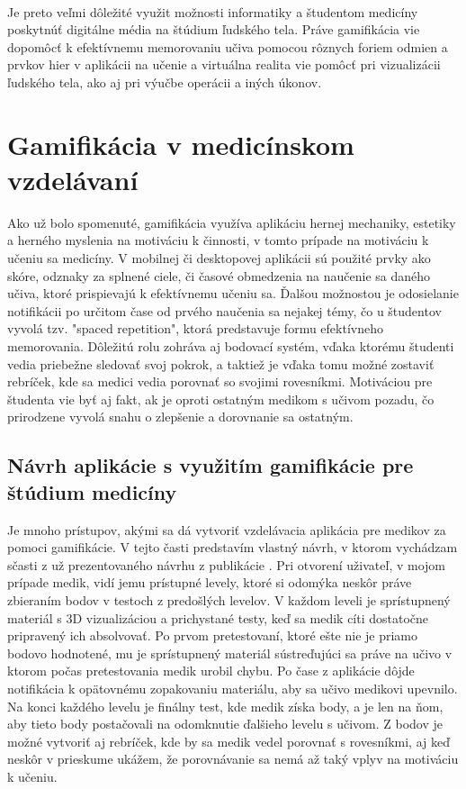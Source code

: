 \documentclass[10pt,twoside,slovak,a4paper]{article}
\begin{document}
\paragraph{}
Je preto veľmi dôležité využit možnosti informatiky a študentom medicíny poskytnúť digitálne média na štúdium ľudského tela. Práve gamifikácia vie dopomôcť k efektívnemu memorovaniu učiva pomocou rôznych foriem odmien a prvkov hier v aplikácii na učenie a virtuálna realita vie pomôcť pri vizualizácii ľudského tela, ako aj pri výučbe operácii a iných úkonov.



\section{Gamifikácia v medicínskom vzdelávaní} \label{druhacast}
Ako už bolo spomenuté, gamifikácia využíva aplikáciu hernej mechaniky, estetiky a herného myslenia na motiváciu k činnosti, v tomto prípade na motiváciu k učeniu sa medicíny. V mobilnej či desktopovej aplikácii sú použité prvky ako skóre, odznaky za splnené ciele, či časové obmedzenia na naučenie sa daného učiva, ktoré prispievajú k efektívnemu učeniu sa. \cite{RojasGamification} Ďalšou možnostou je odosielanie notifikácii po určitom čase od prvého naučenia sa nejakej témy, čo u študentov vyvolá tzv. "spaced repetition", ktorá predstavuje formu efektívneho memorovania. Dôležitú rolu zohráva aj bodovací systém, vďaka ktorému študenti vedia priebežne sledovať svoj pokrok, a taktiež je vďaka tomu možné zostaviť rebríček, kde sa medici vedia porovnať so svojimi rovesníkmi. Motiváciou pre študenta vie byť aj fakt, ak je oproti ostatným medikom s učivom pozadu, čo prirodzene vyvolá snahu o zlepšenie a dorovnanie sa ostatným. \cite{RojasGamification}

\subsection{Návrh aplikácie s využitím gamifikácie pre štúdium medicíny} \label{druhacast:aplikacia} 
Je mnoho prístupov, akými sa dá vytvoriť vzdelávacia aplikácia pre medikov za pomoci gamifikácie. V tejto časti predstavím vlastný návrh, v ktorom vychádzam sčasti z už prezentovaného návrhu z publikácie \cite{9611852}. Pri otvorení uživateľ, v mojom prípade medik, vidí jemu prístupné levely, ktoré si odomýka neskôr práve zbieraním bodov v testoch z predošlých levelov. V každom leveli je sprístupnený materiál s 3D vizualizáciou a prichystané testy, keď sa medik cíti dostatočne pripravený ich absolvovať. Po prvom pretestovaní, ktoré ešte nie je priamo bodovo hodnotené, mu je sprístupnený materiál sústreďujúci sa práve na učivo v ktorom počas pretestovania medik urobil chybu. Po čase z aplikácie dôjde notifikácia k opätovnému zopakovaniu materiálu, aby sa učivo medikovi upevnilo. Na konci každého levelu je finálny test, kde medik získa body, a je len na ňom, aby tieto body postačovali na odomknutie ďalšieho levelu s učivom. Z bodov je možné vytvoriť aj rebríček, kde by sa medik vedel porovnať s rovesníkmi, aj keď neskôr v prieskume ukážem, že porovnávanie sa nemá až taký vplyv na motiváciu k učeniu.
\end{document}
